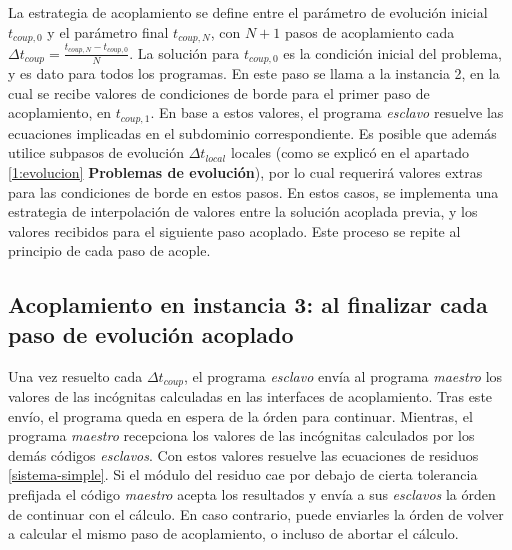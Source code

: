 La estrategia de acoplamiento se define entre el parámetro de evolución inicial $t_{coup,0}$ y el parámetro final $t_{coup,N}$,
con $N+1$ pasos de acoplamiento cada $\Delta t_{coup}=\frac{t_{coup,N} - t_{coup,0}}{N}$.
La solución para $t_{coup,0}$ es la condición inicial del problema, y es dato para todos los programas.
En este paso se llama a la instancia 2, en la cual se recibe valores de condiciones de borde para el primer paso de acoplamiento, en $t_{coup,1}$.
En base a estos valores, el programa \textit{esclavo} resuelve las ecuaciones implicadas en el subdominio correspondiente.
Es posible que además utilice subpasos de evolución $\Delta t_{local}$ locales (como se explicó en el apartado \ref{1:evolucion}  \textbf{Problemas de evolución}),
por lo cual requerirá valores extras para las condiciones de borde en estos pasos. 
En estos casos, se implementa una estrategia de interpolación de valores entre la solución acoplada previa, y los valores recibidos para el siguiente paso acoplado.
Este proceso se repite al principio de cada paso de acople.

\subsection*{Acoplamiento en instancia 3: al finalizar cada paso de evolución acoplado}

Una vez resuelto cada $\Delta t_{coup}$, el programa \textit{esclavo} envía al programa \textit{maestro} los valores de las incógnitas calculadas en las interfaces de acoplamiento.
Tras este envío, el programa queda en espera de la órden para continuar.
Mientras, el programa \textit{maestro} recepciona los valores de las incógnitas calculados por los demás códigos \textit{esclavos}.
Con estos valores resuelve las ecuaciones de residuos \ref{sistema-simple}.
Si el módulo del residuo cae por debajo de cierta tolerancia prefijada el código \textit{maestro} acepta los resultados y envía a sus \textit{esclavos} la órden de continuar con el cálculo.
En caso contrario, puede enviarles la órden de volver a calcular el mismo paso de acoplamiento, o incluso de abortar el cálculo.




